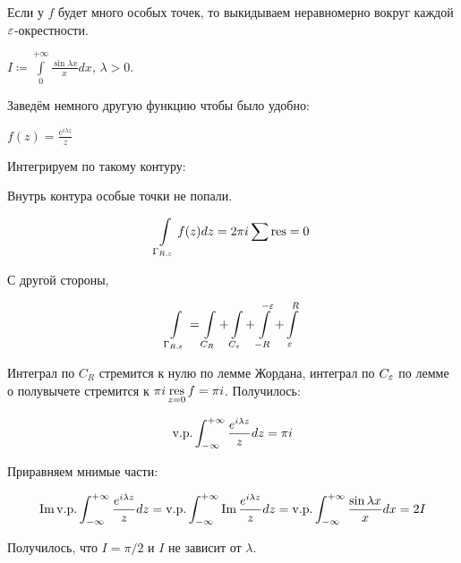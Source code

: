 \begin{observation}
    Если у $f$ будет много особых точек, то выкидываем неравномерно
    вокруг каждой $\varepsilon$-окрестности.
\end{observation}

\begin{example}
    $I \coloneqq \int\limits_0^{+\infty} \frac{\sin \lambda x}{x}dx$,
    $\lambda > 0$.

    Заведём немного другую функцию чтобы было удобно:

    $f(z) = \frac{e^{i\lambda z}}z$

    Интегрируем по такому контуру:


    Внутрь контура особые точки не попали.

    \[
        \int\limits_{\Gamma_{R,\varepsilon}} f(z)dz = 2\pi i \sum\operatorname*{res} = 0
    \]

    С другой стороны,

    \[
        \int\limits_{\Gamma_{R,\varepsilon}}
        = \int\limits_{C_R} + \int\limits_{C_\varepsilon}
        + \int\limits_{-R}^{-\varepsilon} + \int\limits_{\varepsilon}^{R}
    \]

    Интеграл по $C_R$ стремится к нулю по лемме Жордана,
    интеграл по $C_\varepsilon$ по лемме о полувычете стремится к
    $\pi i \operatorname*{res}\limits_{z=0} f = \pi i$. Получилось:

    \[
        \mathrm{v. p. }\int_{-\infty}^{+\infty}
        \frac{e^{i\lambda z}}{z}dz = \pi i
    \]

    Приравняем мнимые части:

    \[
        \operatorname{Im} \mathrm{v. p. }\int_{-\infty}^{+\infty}
        \frac{e^{i\lambda z}}{z}dz
        = \mathrm{v. p. }\int_{-\infty}^{+\infty} \operatorname{Im}
        \frac{e^{i\lambda z}}{z}dz
        = \mathrm{v. p. }\int_{-\infty}^{+\infty}
        \frac{\sin \lambda x}{x}dx
        = 2I
    \]

    Получилось, что $I = \pi / 2$ и $I$ не зависит от $\lambda$.
\end{example}
\newpage
